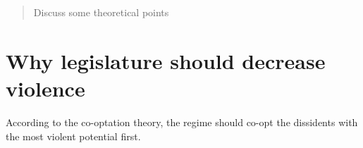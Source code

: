 \documentclass[]{article}
\title{}
\author{}
\begin{document}
\maketitle

\begin{abstract}
Discuss some theoretical points
\end{abstract}

\section{Why legislature should decrease violence}
According to the co-optation theory, the regime should co-opt the dissidents with the most violent potential first.





\end{document}
